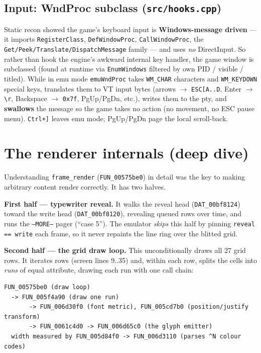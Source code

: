 \documentclass[11pt]{article}
\newcommand{\ic}[1]{\texttt{#1}}
\begin{document}
\subsection{Input: WndProc subclass (\texttt{src/hooks.cpp})}
\label{sec:input}

Static recon showed the game's keyboard input is \textbf{Windows-message driven} ---
it imports \texttt{RegisterClass}, \texttt{DefWindowProc}, \texttt{CallWindowProc},
the \texttt{Get/Peek/Translate/DispatchMessage} family --- and uses \emph{no}
DirectInput. So rather than hook the engine's awkward internal key handler, the game
window is subclassed (found at runtime via \texttt{EnumWindows} filtered by own PID /
visible / titled). While in emu mode \ic{emuWndProc} takes \texttt{WM_CHAR} characters
and \texttt{WM_KEYDOWN} special keys, translates them to VT input bytes
(arrows $\rightarrow$ \ic{ESC[A..D}, Enter $\rightarrow$ \ic{\textbackslash r}, Backspace
$\rightarrow$ \texttt{0x7f}, PgUp/PgDn, etc.), writes them to the pty, and
\textbf{swallows} the message so the game takes no action (no movement, no ESC pause
menu). \texttt{Ctrl+]} leaves emu mode; PgUp/PgDn page the local scroll-back.

\section{The renderer internals (deep dive)}
\label{sec:renderer}

Understanding \ic{frame_render} (\texttt{FUN_00575be0}) in detail was the key to making
arbitrary content render correctly. It has two halves.

\textbf{First half --- typewriter reveal.} It walks the reveal head
(\texttt{DAT_00bf8124}) toward the write head (\texttt{DAT_00bf8120}), revealing queued
rows over time, and runs the \ic{--MORE--} pager (``case 5''). The emulator
\emph{skips} this half by pinning \ic{reveal == write} each frame, so it never repaints
the line ring over the blitted grid.

\textbf{Second half --- the grid draw loop.} This unconditionally draws all 27 grid
rows. It iterates rows (screen lines 9..35) and, within each row, splits the cells
into \emph{runs} of equal attribute, drawing each run with one call chain:

\begin{lstlisting}
FUN_00575be0 (draw loop)
  -> FUN_005f4a90 (draw one run)
       -> FUN_006d30f0 (font metric), FUN_005cd7b0 (position/justify transform)
       -> FUN_0061c4d0 -> FUN_006d65c0 (the glyph emitter)
  width measured by FUN_005d84f0 -> FUN_006d3110 (parses ^N colour codes)
\end{lstlisting}
\end{document}
